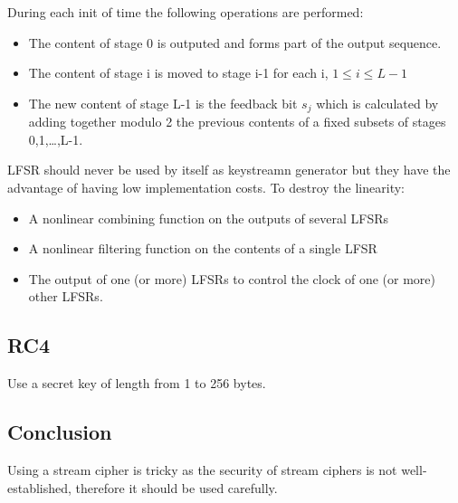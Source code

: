 During each init of time the following operations are performed:
\begin{itemize}
    \item The content of stage 0 is outputed and forms part of the output
    sequence.
    \item The content of stage i is moved to stage i-1 for each i,
    $1\leq i\leq L-1$
    \item The new content of stage L-1 is the feedback bit $s_j$ which is
    calculated by adding together modulo 2 the previous contents of a fixed
    subsets of stages 0,1,\ldots,L-1.
\end{itemize}
LFSR should never be used by itself as keystreamn generator but they have the
advantage of having low implementation costs. To destroy the linearity:
\begin{itemize}
    \item A nonlinear combining function on the outputs of several LFSRs
    \item A nonlinear filtering function on the contents of a single LFSR
    \item The output of one (or more) LFSRs to control the clock of one
    (or more) other LFSRs.
\end{itemize}

\subsection{RC4}
Use a secret key of length from 1 to 256 bytes.

\subsection{Conclusion}
Using a stream cipher is tricky as the security of stream ciphers is not
well-established, therefore it should be used carefully.


